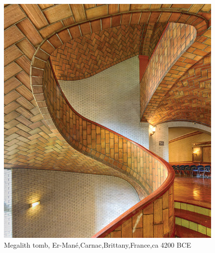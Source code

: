\begin{figure}[H]
\centering
\includegraphics[width=0.8\linewidth ]{figure/Introduction/GuastovinoStair.jpg}
\caption{Megalith tomb, Er-Mané,Carnac,Brittany,France,ca 4200 BCE\cite{ref:WorldHistory}}
\end{figure}


